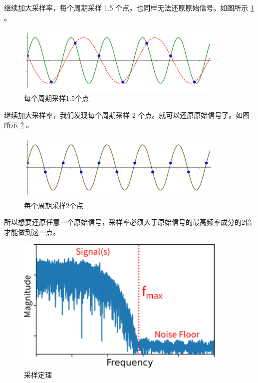 \documentclass[lang=cn,newtx,10pt,scheme=chinese]{elegantbook}
\begin{document}
继续加大采样率，每个周期采样 1.5 个点。也同样无法还原原始信号。如图所示 \ref{fig:sampling_Fs_0.45} 。

\begin{figure}[!htb]
\centering
\includegraphics[width=0.9\textwidth]{sampling_Fs_0.45.pdf}
\caption{每个周期采样1.5个点}
\label{fig:sampling_Fs_0.45}
\end{figure}

继续加大采样率，我们发现每个周期采样 2 个点。就可以还原原始信号了。如图所示 \ref{fig:sampling_Fs_0.6} 。

\begin{figure}[!htb]
\centering
\includegraphics[width=0.9\textwidth]{sampling_Fs_0.6.pdf}
\caption{每个周期采样2个点}
\label{fig:sampling_Fs_0.6}
\end{figure}

所以想要还原任意一个原始信号，采样率必须大于原始信号的最高频率成分的2倍才能做到这一点。

\begin{figure}[!htb]
\centering
\includegraphics[width=0.9\textwidth]{max_freq.pdf}
\caption{采样定理}
\label{fig:max_freq}
\end{figure}
\end{document}

